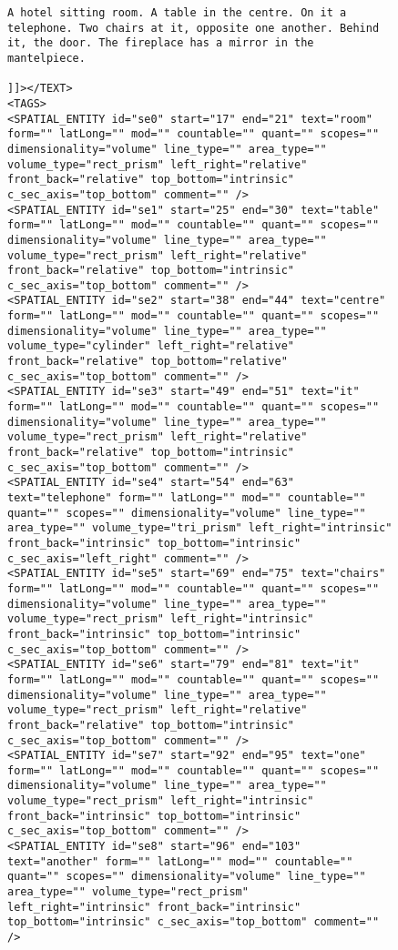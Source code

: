 \documentclass[11pt]{article}
\begin{document}
\begin{appendix}
\begin{figure}
\begin{verbatim}
A hotel sitting room. A table in the centre. On it a telephone. Two chairs at it, opposite one another. Behind it, the door. The fireplace has a mirror in the mantelpiece.

]]></TEXT>
<TAGS>
<SPATIAL_ENTITY id="se0" start="17" end="21" text="room" form="" latLong="" mod="" countable="" quant="" scopes="" dimensionality="volume" line_type="" area_type="" volume_type="rect_prism" left_right="relative" front_back="relative" top_bottom="intrinsic" c_sec_axis="top_bottom" comment="" />
<SPATIAL_ENTITY id="se1" start="25" end="30" text="table" form="" latLong="" mod="" countable="" quant="" scopes="" dimensionality="volume" line_type="" area_type="" volume_type="rect_prism" left_right="relative" front_back="relative" top_bottom="intrinsic" c_sec_axis="top_bottom" comment="" />
<SPATIAL_ENTITY id="se2" start="38" end="44" text="centre" form="" latLong="" mod="" countable="" quant="" scopes="" dimensionality="volume" line_type="" area_type="" volume_type="cylinder" left_right="relative" front_back="relative" top_bottom="relative" c_sec_axis="top_bottom" comment="" />
<SPATIAL_ENTITY id="se3" start="49" end="51" text="it" form="" latLong="" mod="" countable="" quant="" scopes="" dimensionality="volume" line_type="" area_type="" volume_type="rect_prism" left_right="relative" front_back="relative" top_bottom="intrinsic" c_sec_axis="top_bottom" comment="" />
<SPATIAL_ENTITY id="se4" start="54" end="63" text="telephone" form="" latLong="" mod="" countable="" quant="" scopes="" dimensionality="volume" line_type="" area_type="" volume_type="tri_prism" left_right="intrinsic" front_back="intrinsic" top_bottom="intrinsic" c_sec_axis="left_right" comment="" />
<SPATIAL_ENTITY id="se5" start="69" end="75" text="chairs" form="" latLong="" mod="" countable="" quant="" scopes="" dimensionality="volume" line_type="" area_type="" volume_type="rect_prism" left_right="intrinsic" front_back="intrinsic" top_bottom="intrinsic" c_sec_axis="top_bottom" comment="" />
<SPATIAL_ENTITY id="se6" start="79" end="81" text="it" form="" latLong="" mod="" countable="" quant="" scopes="" dimensionality="volume" line_type="" area_type="" volume_type="rect_prism" left_right="relative" front_back="relative" top_bottom="intrinsic" c_sec_axis="top_bottom" comment="" />
<SPATIAL_ENTITY id="se7" start="92" end="95" text="one" form="" latLong="" mod="" countable="" quant="" scopes="" dimensionality="volume" line_type="" area_type="" volume_type="rect_prism" left_right="intrinsic" front_back="intrinsic" top_bottom="intrinsic" c_sec_axis="top_bottom" comment="" />
<SPATIAL_ENTITY id="se8" start="96" end="103" text="another" form="" latLong="" mod="" countable="" quant="" scopes="" dimensionality="volume" line_type="" area_type="" volume_type="rect_prism" left_right="intrinsic" front_back="intrinsic" top_bottom="intrinsic" c_sec_axis="top_bottom" comment="" />

\end{verbatim}
\end{figure}
\end{appendix}
\end{document}

